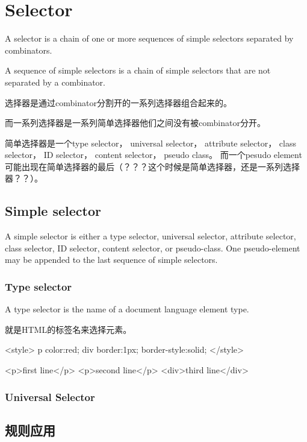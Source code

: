 \section{Selector}

A selector is a chain of one or more sequences of simple selectors separated by combinators.

A sequence of simple selectors is a chain of simple selectors that are not separated by a combinator.



选择器是通过combinator分割开的一系列选择器组合起来的。

而一系列选择器是一系列简单选择器他们之间没有被combinator分开。

简单选择器是一个type selector， universal selector， attribute selector， class selector， ID selector， content selector， pseudo class。 而一个pesudo element可能出现在简单选择器的最后（？？？这个时候是简单选择器，还是一系列选择器？？）。


\subsection{Simple selector}

A simple selector is either a type selector, universal selector, attribute selector, class selector, ID selector, content selector, or pseudo-class. One pseudo-element may be appended to the last sequence of simple selectors.

\subsubsection{Type selector}

A type selector is the name of a document language element type.

就是HTML的标签名来选择元素。

\begin{CSS}
<style>
p {color:red;}
div {border:1px; border-style:solid;}
</style>

<p>first line</p>
<p>second line</p>
<div>third line</div>
\end{CSS}


\subsubsection{Universal Selector}



\subsection{规则应用}

